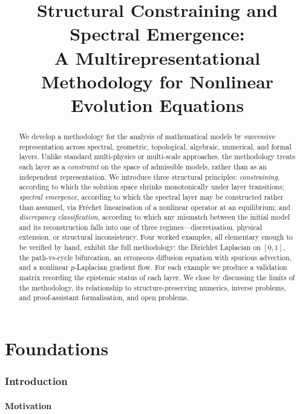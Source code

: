 \documentclass[11pt,a4paper]{article}
\title{%
  \textbf{Structural Constraining and Spectral Emergence:}\\[4pt]
  \large A Multirepresentational Methodology for Nonlinear Evolution Equations
}
\author{}
\date{}
\theoremstyle{definition}
\theoremstyle{plain}
\begin{document}
\maketitle

\begin{abstract}
\noindent
We develop a methodology for the analysis of mathematical models by
successive representation across spectral, geometric, topological,
algebraic, numerical, and formal layers. Unlike standard
multi-physics or multi-scale approaches, the methodology treats each
layer as a \emph{constraint} on the space of admissible models,
rather than as an independent representation. We introduce three
structural principles: \emph{constraining}, according to which the
solution space shrinks monotonically under layer transitions;
\emph{spectral emergence}, according to which the spectral layer
may be constructed rather than assumed, via Fr\'echet linearisation
of a nonlinear operator at an equilibrium; and
\emph{discrepancy classification}, according to which any mismatch
between the initial model and its reconstruction falls into one of
three regimes---discretisation, physical extension, or structural
inconsistency. Four worked examples, all elementary enough to be
verified by hand, exhibit the full methodology: the Dirichlet
Laplacian on $[0,1]$, the path-vs-cycle bifurcation, an erroneous
diffusion equation with spurious advection, and a nonlinear
$p$-Laplacian gradient flow. For each example we produce a
validation matrix recording the epistemic status of each layer. We
close by discussing the limits of the methodology, its relationship
to structure-preserving numerics, inverse problems, and
proof-assistant formalisation, and open problems.
\end{abstract}

\tableofcontents

\part{Foundations}

\section{Introduction}
\label{sec:intro}

\subsection{Motivation}
\end{document}
